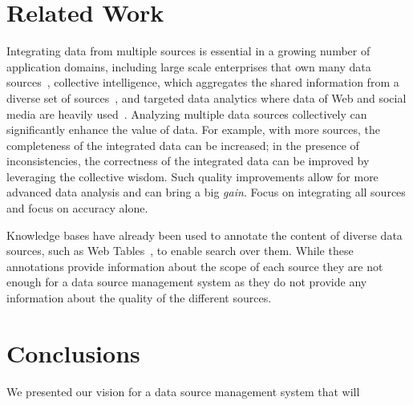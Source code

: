 \documentclass{sig-alternate}
\begin{document}
%
%
%


\section{Related Work}
\label{sec:related}
Integrating data from multiple sources is essential in a growing number of application domains, including large scale enterprises that own many data sources~\cite{halevy:2006}, collective intelligence, which aggregates the shared information from a diverse set of sources~\cite{hua:2013,qi:2013}, and targeted data analytics where data of Web and social media are heavily used~\cite{jin:2013}. Analyzing multiple data sources collectively can significantly enhance the value of data. For example, with more sources, the completeness of the integrated data can be increased; in the presence of inconsistencies, the correctness of the integrated data can be improved by leveraging the collective wisdom. Such quality improvements allow for more advanced data analysis and can bring a big {\em gain}. Focus on integrating all sources and focus on accuracy alone.

Knowledge bases have already been used to annotate the content of diverse data sources, such as Web Tables~\cite{limaye:2010, dassarma:2012, fan:2014}, to enable search over them. While these annotations provide information about the scope of each source they are not enough for a data source management system as they do not provide any information about the quality of the different sources.


\section{Conclusions}
\label{sec:conclusion}
We presented our vision for a data source management system that will 



\end{document}
